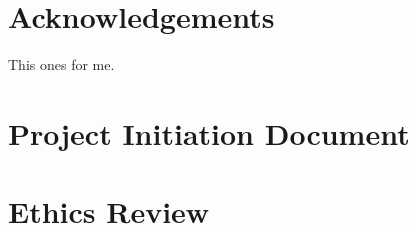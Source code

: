 \documentclass[12pt, a4paper]{report}
\begin{document}
\chapter*{Acknowledgements}
This ones for me.
\newpage





% 
% 





% 

% 







\begin{appendices}
  \newpage

  \chapter{Project Initiation Document}
   \label{appendix:AppendixPID}

  \chapter{Ethics Review}
  
\end{appendices}

\newpage
{}
{}
\printbibliography
\end{document}
